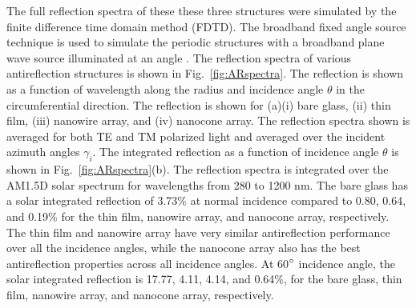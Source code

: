 \documentclass[preprint,12pt]{elsarticle}
\begin{document}
The full reflection spectra of these these three structures were simulated by the finite difference time domain method (FDTD).  
The broadband fixed angle source technique is used to simulate the periodic structures with a broadband plane wave source illuminated at an angle
\cite{Liang:14}.
The reflection spectra of various antireflection structures is shown in 
Fig.~\ref{fig:ARspectra}.
The reflection is shown as a function of wavelength along the radius and incidence angle $\theta$ in the circumferential direction.  The reflection is shown for (a)(i) bare glass, (ii) thin film, (iii) nanowire array, and (iv) nanocone array.  
The reflection spectra shown is averaged for both TE and TM polarized light and averaged over the incident azimuth angles $\gamma_i$.
The integrated reflection as a function of incidence angle $\theta$ is shown in 
Fig.~\ref{fig:ARspectra}(b).  
The reflection spectra is integrated over the AM1.5D solar spectrum \cite{AM1p5}
for wavelengths from 280 to 1200 nm.  
The bare glass has a solar integrated reflection of 3.73\% at normal incidence
compared to 0.80, 0.64, and 0.19\% for the thin film, nanowire array, and nanocone array, respectively.  
The thin film and nanowire array have very similar antireflection performance over all the incidence angles, 
while the nanocone array also has the best antireflection properties across all incidence angles. 
At 60$\degree$ incidence angle, the solar integrated reflection is 
17.77, 4.11, 4.14, and 0.64\%, for the bare glass, thin film, nanowire array, and nanocone array, respectively.  



\end{document}
